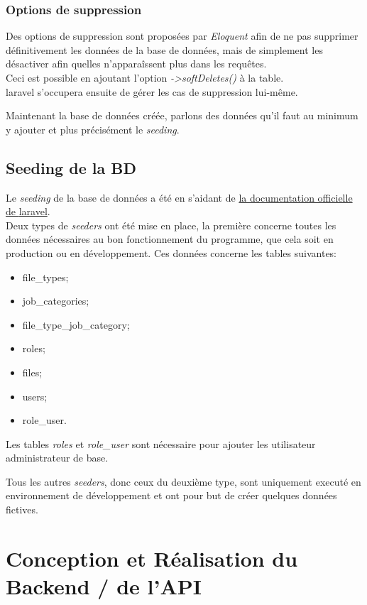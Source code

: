 \documentclass[
    iai, %
    il, %
]{heig-tb}
\begin{document}
\subsection{Options de suppression}
Des options de suppression sont proposées par \emph{Eloquent} afin de ne pas supprimer définitivement les données de la base de données, mais de simplement les désactiver afin quelles n'apparaîssent plus dans les requêtes.\\
Ceci est possible en ajoutant l'option \emph{->softDeletes()} à la table.\\
\Gls{laravel} s'occupera ensuite de gérer les cas de suppression lui-même.

Maintenant la base de données créée, parlons des données qu'il faut au minimum y ajouter et plus précisément le \emph{seeding}.

\section{Seeding de la BD}
Le \emph{seeding} de la base de données a été en s'aidant de \href{https://laravel.com/docs/9.x/seeding}{la documentation officielle de \Gls{laravel}}. \\
Deux types de \emph{seeders} ont été mise en place, la première concerne toutes les données nécessaires au bon fonctionnement du programme, que cela soit en production ou en développement. Ces données  concerne les tables suivantes:
\begin{itemize}
    \item file\_types;
    \item job\_categories;
    \item file\_type\_job\_category;
    \item roles;
    \item files;
    \item users;
    \item role\_user.
\end{itemize}

Les tables \emph{roles} et \emph{role\_user} sont nécessaire pour ajouter les utilisateur administrateur de base.

Tous les autres \emph{seeders}, donc ceux du deuxième type, sont uniquement executé en environnement de développement et ont pour but de créer quelques données fictives.

\chapter{Conception et Réalisation du Backend / de l'API}
\end{document}
